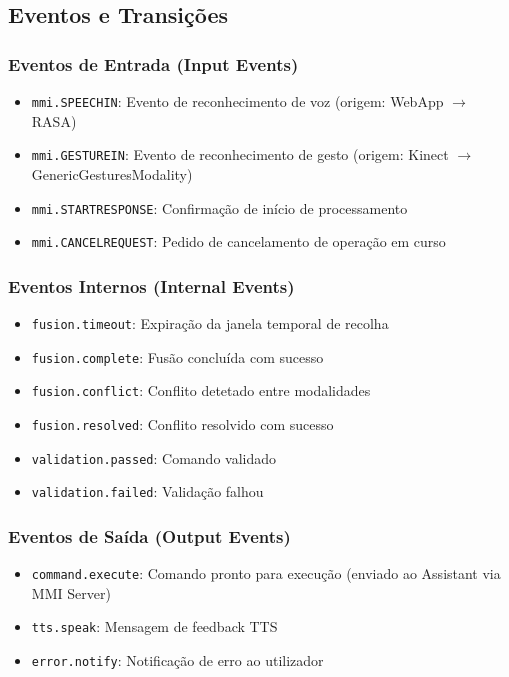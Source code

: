 \subsection{Eventos e Transições}

\subsubsection{Eventos de Entrada (Input Events)}

\begin{itemize}
    \item \texttt{mmi.SPEECHIN}: Evento de reconhecimento de voz (origem: WebApp $\rightarrow$ RASA)
    \item \texttt{mmi.GESTUREIN}: Evento de reconhecimento de gesto (origem: Kinect $\rightarrow$ GenericGesturesModality)
    \item \texttt{mmi.STARTRESPONSE}: Confirmação de início de processamento
    \item \texttt{mmi.CANCELREQUEST}: Pedido de cancelamento de operação em curso
\end{itemize}

\subsubsection{Eventos Internos (Internal Events)}

\begin{itemize}
    \item \texttt{fusion.timeout}: Expiração da janela temporal de recolha
    \item \texttt{fusion.complete}: Fusão concluída com sucesso
    \item \texttt{fusion.conflict}: Conflito detetado entre modalidades
    \item \texttt{fusion.resolved}: Conflito resolvido com sucesso
    \item \texttt{validation.passed}: Comando validado
    \item \texttt{validation.failed}: Validação falhou
\end{itemize}

\subsubsection{Eventos de Saída (Output Events)}

\begin{itemize}
    \item \texttt{command.execute}: Comando pronto para execução (enviado ao Assistant via MMI Server)
    \item \texttt{tts.speak}: Mensagem de feedback TTS
    \item \texttt{error.notify}: Notificação de erro ao utilizador
\end{itemize}

